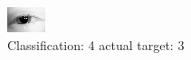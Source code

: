 \begin{figure}[h!]
\begin{center}
\includegraphics[width=0.60\columnwidth]{figures/ID52_class_4_target_3.png}
\end{center}
\caption{ Classification: 4 actual target: 3}
\label{fig:ID52_class_4_target_3}
\end{figure}
